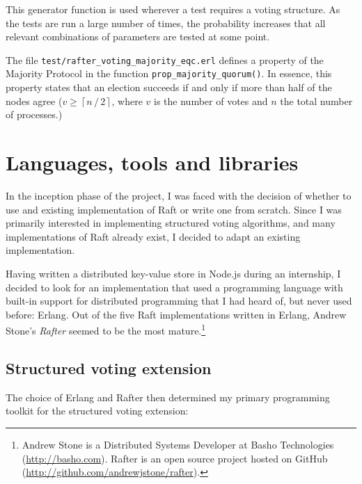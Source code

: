 \documentclass[draft,11pt,chapterprefix=true,toc=bibliography,numbers=noendperiod,
               footnotes=multiple,twoside]{scrreprt}
\begin{document}
This generator function is used wherever a test requires a voting structure. As the tests are run a large number of times, the probability increases that all relevant combinations of parameters are tested at some point.


The file \texttt{test/rafter\_voting\_majority\_eqc.erl} defines a property of the Majority Protocol in the function \texttt{prop\_majority\_quorum()}. In essence, this property states that an election succeeds if and only if more than half of the nodes agree (\(v \ge \left\lceil n \, / \, 2 \right\rceil \), where \(v\) is the number of votes and \(n\) the total number of processes.)

\section{Languages, tools and libraries\label{sc:tools}}

In the inception phase of the project, I was faced with the decision of whether to use and existing implementation of Raft or write one from scratch. Since I was primarily interested in implementing structured voting algorithms, and many implementations of Raft already exist, I decided to adapt an existing implementation.

Having written a distributed key-value store in Node.js during an internship, I decided to look for an implementation that used a programming language with built-in support for distributed programming that I had heard of, but never used before: Erlang. Out of the five Raft implementations written in Erlang, Andrew Stone's \emph{Rafter} seemed to be the most mature.\footnote{Andrew Stone is a Distributed Systems Developer at Basho Technologies (\url{http://basho.com}). Rafter is an open source project hosted on GitHub (\url{http://github.com/andrewjstone/rafter}).}

\subsection{Structured voting extension}

The choice of Erlang and Rafter then determined my primary programming toolkit for the structured voting extension:
\end{document}
